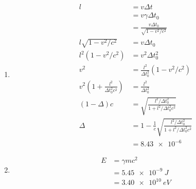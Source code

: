 \documentclass{article}
\begin{document}
\begin{enumerate}
  \item

        \begin{align*}
          l                                                   & = v \Delta t                                                                   \\
                                                              & = v \gamma \Delta t_0                                                          \\
                                                              & = \frac{v \Delta t_0}{\sqrt{1 - v^2 / c^2}}                                    \\
          l \sqrt{1 - v^2 / c^2}                              & = v \Delta t_0                                                                 \\
          l^2 (1 - v^2 / c^2)                                 & = v^2 \Delta t_0^2                                                             \\
          v^2                                                 & = \frac{l^2}{\Delta t_0^2} (1 - v^2 / c^2)                                     \\
          v^2 \left( 1 + \frac{l^2}{\Delta t_0^2 c^2} \right) & = \frac{l^2}{\Delta t_0^2}                                                     \\
          (1 - \Delta) c                                      & = \sqrt{\frac{l^2 / \Delta t_0^2}{1 + l^2 / \Delta t_0^2 c^2}}                 \\
          \Delta                                              & = 1 - \frac{1}{c} \sqrt{\frac{l^2 / \Delta t_0^2}{1 + l^2 / \Delta t_0^2 c^2}} \\
                                                              & = \num{8.43e-6}
        \end{align*}

  \item

        \begin{align*}
          E & = \gamma m c^2      \\
            & = \qty{5.45e-9}{J}  \\
            & = \qty{3.40e10}{eV}
        \end{align*}
\end{enumerate}

\setcounter{subsubsection}{44}
\subsubsection{}
\end{document}
